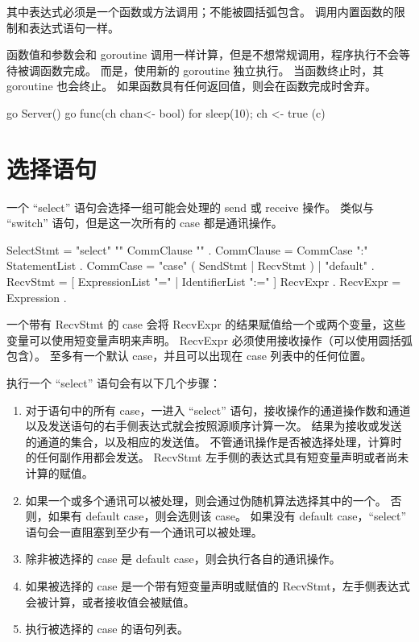 其中表达式必须是一个函数或方法调用；不能被圆括弧包含。
调用内置函数的限制和表达式语句一样。

函数值和参数会和 goroutine 调用一样计算，但是不想常规调用，程序执行不会等待被调函数完成。
而是，使用新的 goroutine 独立执行。
当函数终止时，其 goroutine 也会终止。
如果函数具有任何返回值，则会在函数完成时舍弃。
\begin{golang}
go Server()
go func(ch chan<- bool) { for { sleep(10); ch <- true }} (c)
\end{golang}

\section{选择语句}
一个 ``select'' 语句会选择一组可能会处理的 send 或 receive 操作。
类似与 ``switch'' 语句，但是这一次所有的 case 都是通讯操作。
\begin{EBNF}
SelectStmt = "select" "{" { CommClause } "}" .
CommClause = CommCase ":" StatementList .
CommCase   = "case" ( SendStmt | RecvStmt ) | "default" .
RecvStmt   = [ ExpressionList "=" | IdentifierList ":=" ] RecvExpr .
RecvExpr   = Expression .
\end{EBNF}

一个带有 RecvStmt 的 case 会将 RecvExpr 的结果赋值给一个或两个变量，这些变量可以使用短变量声明来声明。
RecvExpr 必须使用接收操作（可以使用圆括弧包含）。
至多有一个默认 case，并且可以出现在 case 列表中的任何位置。

执行一个 ``select'' 语句会有以下几个步骤：
\begin{enumerate}
\item 
对于语句中的所有 case，一进入 ``select'' 语句，接收操作的通道操作数和通道以及发送语句的右手侧表达式就会按照源顺序计算一次。
结果为接收或发送的通道的集合，以及相应的发送值。
不管通讯操作是否被选择处理，计算时的任何副作用都会发送。
RecvStmt 左手侧的表达式具有短变量声明或者尚未计算的赋值。
\item 
如果一个或多个通讯可以被处理，则会通过伪随机算法选择其中的一个。
否则，如果有 default case，则会选则该 case。
如果没有 default case，``select'' 语句会一直阻塞到至少有一个通讯可以被处理。
\item 
除非被选择的 case 是 default case，则会执行各自的通讯操作。
\item 
如果被选择的 case 是一个带有短变量声明或赋值的 RecvStmt，左手侧表达式会被计算，或者接收值会被赋值。
\item 
执行被选择的 case 的语句列表。
\end{enumerate}

